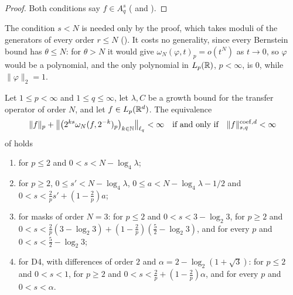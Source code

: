 \begin{proof}
\leanok
{}
Both conditions say $f \in A^s_q$ ( and
).
\end{proof}

The condition $s < N$ is needed only by the proof, which takes moduli of the generators of every
order $r \leq N$ (). It costs no generality, since every
Bernstein bound has $\theta \leq N$: for $\theta > N$ it would give
$\omega_N(\varphi, t)_p = o(t^N)$ as $t \to 0$, so $\varphi$ would be a polynomial, and the only
polynomial in $L_p(\mathbb{R})$, $p < \infty$, is $0$, while $\|\varphi\|_2 = 1$.

\begin{corollary}
\label{cor:daub-rd-besov-orders}
\leanok
{}
Let $1 \leq p < \infty$ and $1 \leq q \leq \infty$, let $\lambda, C$ be a growth bound for the
transfer operator of order $N$, and let $f \in L_p(\mathbb{R}^d)$. The equivalence
\[
  \|f\|_p + \bigl\|\bigl(2^{ks} \omega_N(f, 2^{-k})_p\bigr)_{k \in \mathbb{N}}\bigr\|_{\ell_q} < \infty
  \quad\text{if and only if}\quad \|f\|^{\mathrm{coef},d}_{s,q} < \infty
\]
of  holds
\begin{enumerate}
  \item for $p \leq 2$ and $0 < s < N - \log_4 \lambda$;
  \item for $p \geq 2$, $0 \leq s' < N - \log_4 \lambda$, $0 \leq a < N - \log_4 \lambda - 1/2$
    and $0 < s < \frac{2}{p} s' + (1 - \frac{2}{p}) a$;
  \item for masks of order $N = 3$: for $p \leq 2$ and $0 < s < 3 - \log_2 3$, for $p \geq 2$
    and $0 < s < \frac{2}{p}(3 - \log_2 3) + (1 - \frac{2}{p})(\frac{5}{2} - \log_2 3)$, and for
    every $p$ and $0 < s < \frac{5}{2} - \log_2 3$;
  \item for D4, with differences of order $2$ and $\alpha = 2 - \log_2(1 + \sqrt{3})$: for
    $p \leq 2$ and $0 < s < 1$, for $p \geq 2$ and
    $0 < s < \frac{2}{p} + (1 - \frac{2}{p}) \alpha$, and for every $p$ and $0 < s < \alpha$.
\end{enumerate}
\end{corollary}

